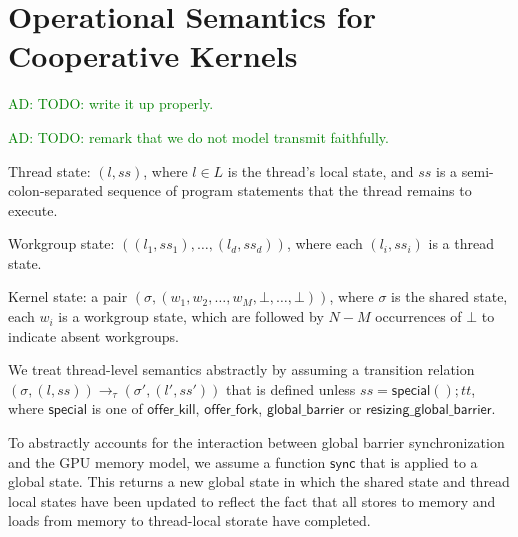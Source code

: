 \documentclass[numbers,nocopyrightspace,10pt]{sigplanconf}
\newcommand{\ADComment}[1]{\textcolor{green}{AD: #1}}
\newcommand{\offerfork}{\mathsf{offer\_fork}}
\newcommand{\offerkill}{\mathsf{offer\_kill}}
\newcommand{\globalbarrier}{\mathsf{global\_barrier}}
\newcommand{\resizingglobalbarrier}{\mathsf{resizing\_global\_barrier}}
\begin{document}



\appendix

\section{Operational Semantics for Cooperative Kernels}\label{appendix:semantics}

\ADComment{TODO: write it up properly.}

\ADComment{TODO: remark that we do not model transmit faithfully.}

Thread state: $(l, \mathit{ss})$, where $l \in L$ is the thread's
local state, and $\mathit{ss}$ is a semi-colon-separated sequence of
program statements that the thread remains to execute.

Workgroup state: $((l_1, \mathit{ss}_1), \dots, (l_d,
\mathit{ss}_d))$, where each $(l_i, \mathit{ss}_i)$ is a thread state.

Kernel state: a pair $(\sigma, (w_1, w_2, \dots, w_M, \bot, \dots, \bot))$, where $\sigma$ is the shared state,
each $w_i$ is a workgroup state, which are
followed by $N-M$ occurrences of $\bot$ to indicate absent workgroups.

We treat thread-level semantics abstractly by assuming a transition
relation $(\sigma, (l, \mathit{ss})) \rightarrow_{\tau} (\sigma', (l',
\mathit{ss}'))$ that is defined unless $\mathit{ss} =
\mathsf{special}(); \mathit{tt}$, where $\mathsf{special}$ is one of
$\offerkill$, $\offerfork$, $\globalbarrier$ or
$\resizingglobalbarrier$.

To abstractly accounts for the interaction between global barrier
synchronization and the GPU memory model, we assume a function
$\mathsf{sync}$ that is applied to a global state.  This returns a new
global state in which the shared state and thread local states have
been updated to reflect the fact that all stores to memory and loads
from memory to thread-local storate have completed.
\end{document}
